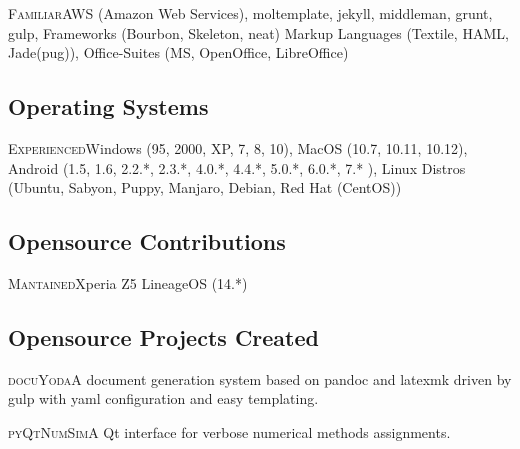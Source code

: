 \documentclass[11pt,a4paper, final, factor=1100, stretch=18, shrink=18]{moderncv}
\newcommand{\spacesubsection}{\vspace{0.2cm}}
\begin{document}
           {\textsc{Familiar}}{AWS (Amazon Web Services), moltemplate, jekyll, middleman, grunt, gulp, Frameworks (Bourbon, Skeleton, neat) Markup Languages (Textile, HAML, Jade(pug)), Office-Suites (MS, OpenOffice, LibreOffice)}

\spacesubsection
\subsection{Operating Systems}
           {\textsc{Experienced}}{Windows (95, 2000, XP, 7, 8, 10), MacOS (10.7, 10.11, 10.12), Android (1.5, 1.6, 2.2.*, 2.3.*, 4.0.*, 4.4.*, 5.0.*, 6.0.*, 7.* ), Linux Distros (Ubuntu, Sabyon, Puppy, Manjaro, Debian, Red Hat (CentOS))}

\spacesubsection
\subsection{Opensource Contributions}
\spacesubsection

           {\textsc{Mantained}}{Xperia Z5 LineageOS (14.*)}

\newpage

\subsection{Opensource Projects Created}
\spacesubsection

           {\textsc{docuYoda}}{A document generation system based on pandoc and latexmk driven by gulp with yaml configuration and easy templating.}

           {\textsc{pyQtNumSim}}{A Qt interface for verbose numerical methods assignments.}
\end{document}
